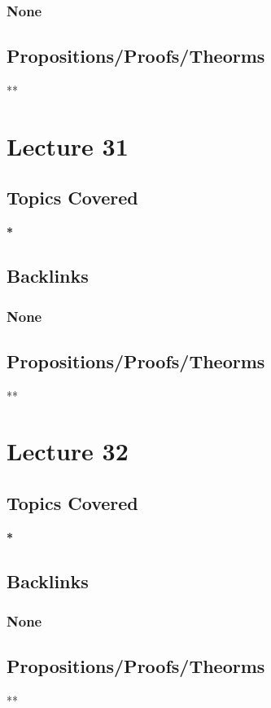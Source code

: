 \documentclass[11pt]{article}
\begin{document}
\subsubsection*{None}
\label{sec:orge690e9e}
\subsection*{Propositions/Proofs/Theorms}
\label{sec:org4769a5d}
**

\section*{Lecture 31}
\label{sec:org5a83fee}
\subsection*{Topics Covered}
\label{sec:orgfcb1fb3}
\textbf{*}
\subsection*{Backlinks}
\label{sec:org3322c6e}
\subsubsection*{None}
\label{sec:orgaeaaa95}
\subsection*{Propositions/Proofs/Theorms}
\label{sec:org4c3a7bf}
**

\section*{Lecture 32}
\label{sec:org5665274}
\subsection*{Topics Covered}
\label{sec:org5d71f25}
\textbf{*}
\subsection*{Backlinks}
\label{sec:org6574492}
\subsubsection*{None}
\label{sec:org4e24d7b}
\subsection*{Propositions/Proofs/Theorms}
\label{sec:org9fd00dc}
**
\end{document}
